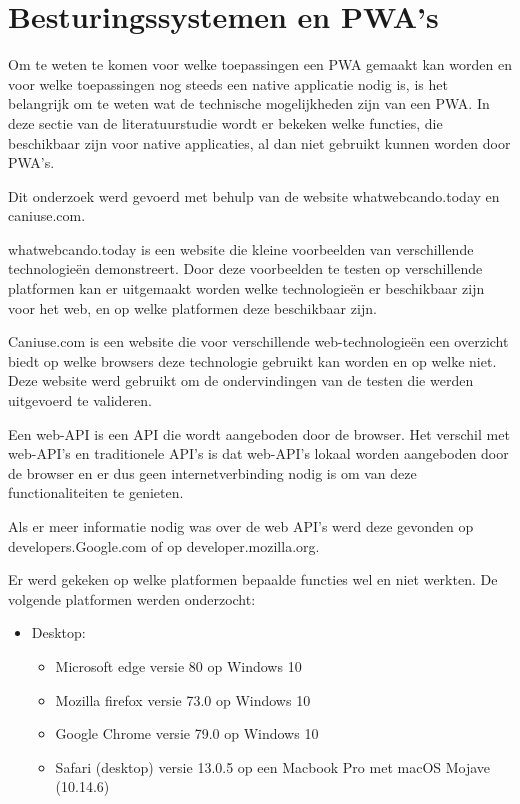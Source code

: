 

\section{Besturingssystemen en PWA’s}

Om te weten te komen voor welke toepassingen een PWA gemaakt kan worden en voor welke toepassingen nog steeds een native applicatie nodig is, is het belangrijk om te weten wat de technische mogelijkheden zijn van een PWA. In deze sectie van de literatuurstudie wordt er bekeken welke functies, die beschikbaar zijn voor native applicaties, al dan niet gebruikt kunnen worden door PWA’s.

Dit onderzoek werd gevoerd met behulp van de website whatwebcando.today en caniuse.com. 

whatwebcando.today is een website die kleine voorbeelden van verschillende technologieën demonstreert. Door deze voorbeelden te testen op verschillende platformen kan er uitgemaakt worden welke technologieën er beschikbaar zijn voor het web, en op welke platformen deze beschikbaar zijn.

Caniuse.com is een website die voor verschillende web-technologieën een overzicht biedt op welke browsers deze technologie gebruikt kan worden en op welke niet. Deze website werd gebruikt om de ondervindingen van de testen die werden uitgevoerd te valideren. 

Een web-API is een API die wordt aangeboden door de browser. Het verschil met web-API’s en traditionele API’s is dat web-API’s lokaal worden aangeboden door de browser en er dus geen internetverbinding nodig is om van deze functionaliteiten te genieten.

\autocite{Mozilla2019c}

Als er meer informatie nodig was over de web API’s werd deze gevonden op developers.Google.com of op developer.mozilla.org. 

Er werd gekeken op welke platformen bepaalde functies wel en niet werkten. De volgende platformen werden onderzocht:
\begin{itemize}
   \item Desktop:
   \begin{itemize}
     \item	Microsoft edge versie 80 op Windows 10
     \item	Mozilla firefox versie 73.0 op Windows 10
     \item	Google Chrome versie 79.0 op Windows 10
     \item  Safari (desktop) versie 13.0.5 op een Macbook Pro met macOS Mojave (10.14.6)
   \end{itemize}
\end{itemize}


